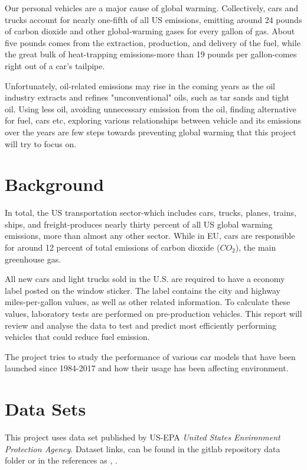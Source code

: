 \documentclass{acm_proc_article-sp}
\begin{document}
Our personal vehicles are a major cause of global warming. Collectively, cars and trucks account for nearly one-fifth of all US emissions, emitting around 24 pounds of carbon dioxide and other global-warming gases for every gallon of gas. About five pounds comes from the extraction, production, and delivery of the fuel, while the great bulk of heat-trapping emissions-more than 19 pounds per gallon-comes right out of a car's tailpipe.

Unfortunately, oil-related emissions may rise in the coming years as the oil industry extracts and refines "unconventional" oils, such as tar sands and tight oil. Using less oil, avoiding unnecessary emission from the oil, finding alternative for fuel, cars etc, exploring various relationships between vehicle and its emissions over the years are few steps towards preventing global warming that this project will try to focus on. \cite{ConcernedScientists2014}


\section{Background}
In total, the US transportation sector-which includes cars, trucks, planes, trains, ships, and freight-produces nearly thirty percent of all US global warming emissions, more than almost any other sector. While in EU, cars are responsible for around 12 percent of total emissions of carbon dioxide ($CO_{2}$), the main greenhouse gas.

All new cars and light trucks sold in the U.S. are required to have a economy label posted on the window sticker. The label contains the city and highway miles-per-gallon values, as well as other related information. To calculate these values, laboratory tests are performed on pre-production vehicles.
This report will review and analyse the data to test and predict most efficiently performing vehicles that could reduce fuel emission.

The project tries to study the performance of various car models that have been launched since 1984-2017 and how their usage has been affecting environment.

\section{Data Sets}
This project uses data set published by US-EPA \textit{United States Environment Protection Agency}. Dataset links, can be found in the gitlab repository data folder or in the references as \cite{2014}, \cite{2015}.
\end{document}
